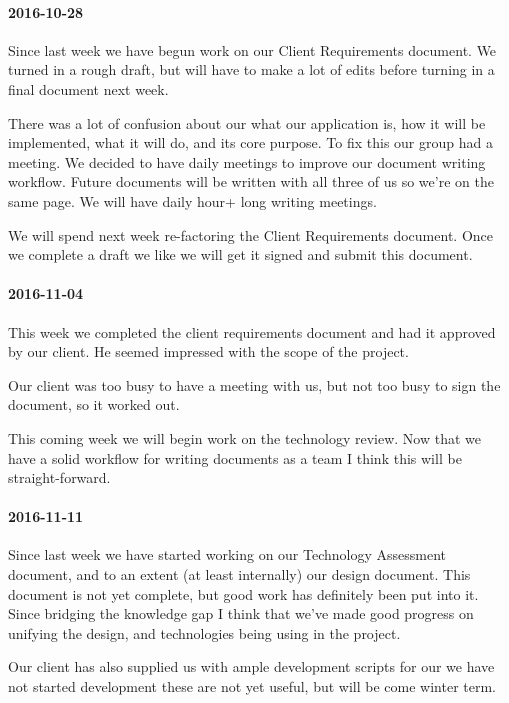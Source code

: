 \paragraph{2016-10-28}

Since last week we have begun work on our Client Requirements document.
We turned in a rough draft, but will have to make a lot of edits before turning in a final document next week.

There was a lot of confusion about our what our application is, how it will be implemented, what it will do, and its core purpose.
To fix this our group had a meeting.
We decided to have daily meetings to improve our document writing workflow.
Future documents will be written with all three of us so we're on the same page.
We will have daily hour+ long writing meetings.

We will spend next week re-factoring the Client Requirements document.
Once we complete a draft we like we will get it signed and submit this document.

\paragraph{2016-11-04}

This week we completed the client requirements document and had it approved by our client.
He seemed impressed with the scope of the project.

Our client was too busy to have a meeting with us, but not too busy to sign the document, so it worked out.

This coming week we will begin work on the technology review.
Now that we have a solid workflow for writing documents as a team I think this will be straight-forward.

\paragraph{2016-11-11}

Since last week we have started working on our Technology Assessment document, and to an extent (at least internally) our design document.
This document is not yet complete, but good work has definitely been put into it.
Since bridging the knowledge gap I think that we've made good progress on unifying the design, and technologies being using in the project.

Our client has also supplied us with ample development scripts for our   we have not started development these are not yet useful, but will be come winter term.

